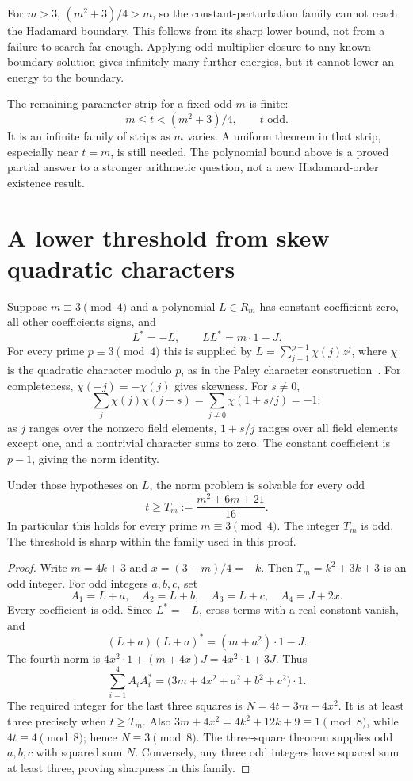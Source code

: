 For $m>3$, $(m^2+3)/4>m$, so the constant-perturbation family cannot
reach the Hadamard boundary. This follows from its sharp lower bound,
not from a failure to search far enough. Applying odd multiplier closure
to any known boundary solution gives infinitely many further energies,
but it cannot lower an energy to the boundary.

The remaining parameter strip for a fixed odd $m$ is finite:
\[
 m\le t<(m^2+3)/4,\qquad t\text{ odd}.
\]
It is an infinite family of strips as $m$ varies. A uniform theorem in
that strip, especially near $t=m$, is still needed. The polynomial
bound above is a proved partial answer to a stronger arithmetic question,
not a new Hadamard-order existence result.

\section*{A lower threshold from skew quadratic characters}
Suppose $m\equiv3\pmod4$ and a polynomial $L\in R_m$ has constant
coefficient zero, all other coefficients signs, and
\[
 L^*=-L,\qquad LL^*=m\cdot1-J.
\]
For every prime $p\equiv3\pmod4$ this is supplied by
$L=\sum_{j=1}^{p-1}\chi(j)z^j$, where $\chi$ is the quadratic character
modulo $p$, as in the Paley character construction~\cite{Paley}.
For completeness, $\chi(-j)=-\chi(j)$ gives skewness. For $s\ne0$,
\[
 \sum_j\chi(j)\chi(j+s)
 =\sum_{j\ne0}\chi(1+s/j)=-1:
\]
as $j$ ranges over the nonzero field elements, $1+s/j$ ranges over all
field elements except one, and a nontrivial character sums to zero.
The constant coefficient is $p-1$, giving the norm identity.

\begin{theorem}\label{thm:skew}
Under those hypotheses on $L$, the norm problem is solvable for every
odd
\[
 t\ge T_m:=\frac{m^2+6m+21}{16}.
\]
In particular this holds for every prime $m\equiv3\pmod4$.
The integer $T_m$ is odd. The threshold is sharp within the family
used in this proof.
\end{theorem}
\begin{proof}
Write $m=4k+3$ and $x=(3-m)/4=-k$. Then
$T_m=k^2+3k+3$ is an odd integer.
For odd integers $a,b,c$, set
\[
 A_1=L+a,\quad A_2=L+b,\quad A_3=L+c,\quad A_4=J+2x.
\]
Every coefficient is odd. Since $L^*=-L$, cross terms with a real
constant vanish, and
\[
 (L+a)(L+a)^*=(m+a^2)\cdot1-J.
\]
The fourth norm is $4x^2\cdot1+(m+4x)J=4x^2\cdot1+3J$.
Thus
\[
 \sum_{i=1}^4 A_iA_i^*
 =\bigl(3m+4x^2+a^2+b^2+c^2\bigr)\cdot1.
\]
The required integer for the last three squares is
$N=4t-3m-4x^2$. It is at least three precisely when $t\ge T_m$.
Also $3m+4x^2=4k^2+12k+9\equiv1\pmod8$, while $4t\equiv4\pmod8$;
hence $N\equiv3\pmod8$. The three-square theorem supplies odd
$a,b,c$ with squared sum $N$. Conversely, any three odd integers have
squared sum at least three, proving sharpness in this family.
\end{proof}

